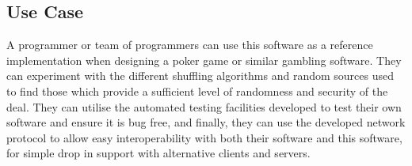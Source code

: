 \subsection{Use Case}

A programmer or team of programmers can use this software as a reference
implementation when designing a poker game or similar gambling software. They
can experiment with the different shuffling algorithms and random sources
used to find those which provide a sufficient level of randomness and security
of the deal. They can utilise the automated testing facilities developed to
test their own software and ensure it is bug free, and finally, they can
use the developed network protocol to allow easy interoperability with both
their software and this software, for simple drop in support with alternative
clients and servers.
